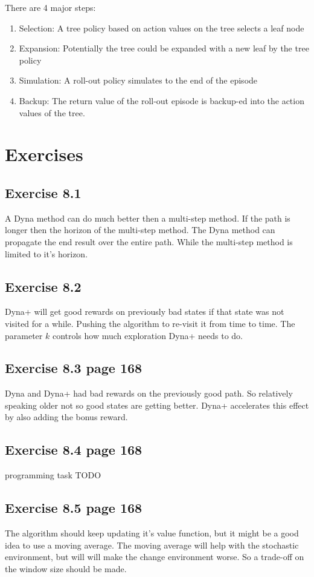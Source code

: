 There are 4 major steps:

\begin{enumerate}
	\item Selection: A tree policy based on action values on the tree selects a leaf node
	\item Expansion: Potentially the tree could be expanded with a new leaf by the tree policy
	\item Simulation: A roll-out policy simulates to the end of the episode
	\item Backup: The return value of the roll-out episode is backup-ed into the action values of the tree.
\end{enumerate}

\section{Exercises}

\subsection{Exercise 8.1}
A Dyna method can do much better then a multi-step method. If the path is longer then the horizon of the multi-step method. The Dyna method can propagate the end result over the entire path. While the multi-step method is limited to it's horizon.

\subsection{Exercise 8.2}
Dyna+ will get good rewards on previously bad states if that state was not visited for a while. Pushing the algorithm to re-visit it from time to time. The parameter $k$ controls how much exploration Dyna+ needs to do.

\subsection{Exercise 8.3 page 168}
Dyna and Dyna+ had bad rewards on the previously good path. So relatively speaking older not so good states are getting better. Dyna+ accelerates this effect by also adding the bonus reward.

\subsection{Exercise 8.4 page 168}
programming task TODO

\subsection{Exercise 8.5 page 168}
The algorithm should keep updating it's value function, but it might be a good idea to use a moving average. The moving average will help with the stochastic environment, but will will make the change environment worse. So a trade-off on the window size should be made. 

